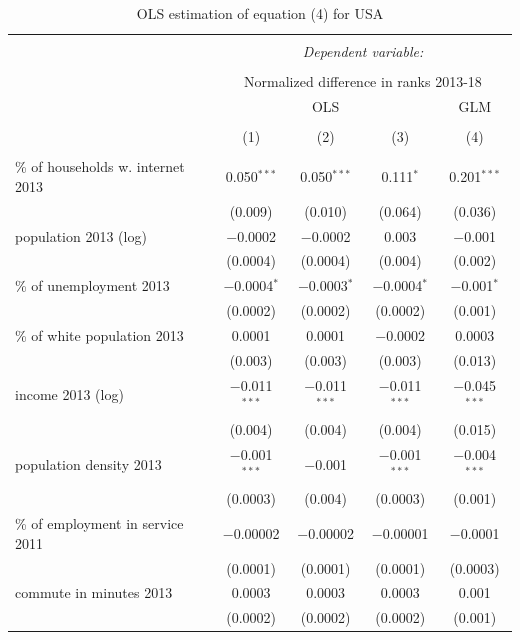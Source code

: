 \documentclass[10pt,letterpaper]{article}
\begin{document}
\begin{table}[!htbp] \centering 
  \caption{OLS estimation of equation (4) for USA\label{ols.usa}} 
  \label{} 
\small 
\begin{tabular}{@{\extracolsep{1pt}}lcccc} 
\\[-1.8ex]\hline 
\hline \\[-1.8ex] 
 & \multicolumn{4}{c}{\textit{Dependent variable:}} \\ 
\cline{2-5} 
\\[-1.8ex] & \multicolumn{4}{c}{Normalized difference in ranks 2013-18} \\ 
 & \multicolumn{3}{c}{OLS} & GLM \\ 
\\[-1.8ex] & (1) & (2) & (3) & (4)\\ 
\hline \\[-1.8ex] 
 \% of households w. internet 2013 & 0.050$^{***}$ & 0.050$^{***}$ & 0.111$^{*}$ & 0.201$^{***}$ \\ 
  & (0.009) & (0.010) & (0.064) & (0.036) \\ 
  population 2013 (log) & $-$0.0002 & $-$0.0002 & 0.003 & $-$0.001 \\ 
  & (0.0004) & (0.0004) & (0.004) & (0.002) \\ 
  \% of unemployment 2013 & $-$0.0004$^{*}$ & $-$0.0003$^{*}$ & $-$0.0004$^{*}$ & $-$0.001$^{*}$ \\ 
  & (0.0002) & (0.0002) & (0.0002) & (0.001) \\ 
  \% of white population 2013 & 0.0001 & 0.0001 & $-$0.0002 & 0.0003 \\ 
  & (0.003) & (0.003) & (0.003) & (0.013) \\ 
  income 2013 (log) & $-$0.011$^{***}$ & $-$0.011$^{***}$ & $-$0.011$^{***}$ & $-$0.045$^{***}$ \\ 
  & (0.004) & (0.004) & (0.004) & (0.015) \\ 
  population density 2013 & $-$0.001$^{***}$ & $-$0.001 & $-$0.001$^{***}$ & $-$0.004$^{***}$ \\ 
  & (0.0003) & (0.004) & (0.0003) & (0.001) \\ 
  \% of employment in service 2011 & $-$0.00002 & $-$0.00002 & $-$0.00001 & $-$0.0001 \\ 
  & (0.0001) & (0.0001) & (0.0001) & (0.0003) \\ 
  commute in minutes 2013 & 0.0003 & 0.0003 & 0.0003 & 0.001 \\ 
  & (0.0002) & (0.0002) & (0.0002) & (0.001) \\ 

\end{tabular}
\end{table}
\end{document}
